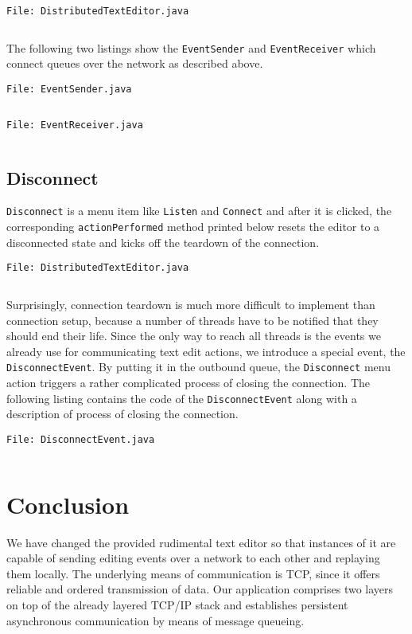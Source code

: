 \documentclass[a4paper,draft,12pt,oneside,article,table]{memoir}
\newcommand{\srcpath}{../ex09/src/main/java/ddist}
\newcommand{\inmnt}[3]{\vspace{1em}\noindent\texttt{\color{gray}File: #3}\vspace{-1em}\inputminted[tabsize=4,firstline=#1,firstnumber=#1,lastline=#2,linenos]{java}{\srcpath/#3}}
\newcommand{\mil}[1]{\texttt{#1}}
\begin{document}
\inmnt{300}{318}{DistributedTextEditor.java}

The following two listings show the \mil{EventSender} and
\mil{EventReceiver} which connect queues over the network as described
above.

\inmnt{1}{1000}{EventSender.java}

\inmnt{1}{1000}{EventReceiver.java}

\section{Disconnect}

\mil{Disconnect} is a menu item like \mil{Listen} and \mil{Connect} and
after it is clicked, the corresponding \mil{actionPerformed} method
printed below resets the editor to a disconnected state and kicks off
the teardown of the connection.

\inmnt{230}{240}{DistributedTextEditor.java}

Surprisingly, connection teardown is much more difficult to implement
than connection setup, because a number of threads have to be notified
that they should end their life. Since the only way to reach all threads
is the events we already use for communicating text edit actions, we
introduce a special event, the \mil{DisconnectEvent}. By putting it in
the outbound queue, the \mil{Disconnect} menu action triggers a rather
complicated process of closing the connection. The following listing
contains the code of the \mil{DisconnectEvent} along with a description
of process of closing the connection.

\inmnt{1}{1000}{DisconnectEvent.java}


\chapter{Conclusion}

We have changed the provided rudimental text editor so that instances of
it are capable of sending editing events over a network to each other
and replaying them locally. The underlying means of communication is
TCP, since it offers reliable and ordered transmission of data. Our
application comprises two layers on top of the already layered TCP/IP
stack and establishes persistent asynchronous communication by means of
message queueing.
\end{document}
